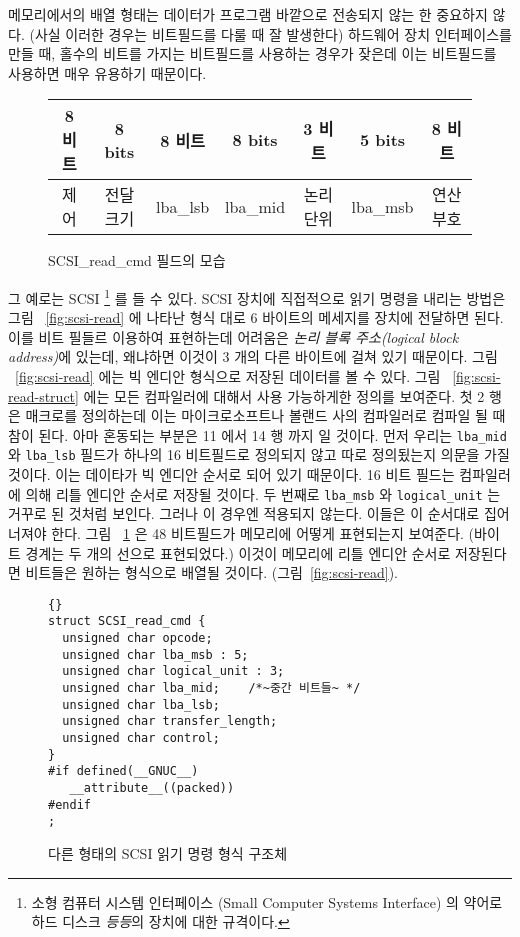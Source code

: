 메모리에서의 배열 형태는 데이터가 프로그램 바깥으로 전송되지 않는 한 중요하지 않다.
(사실 이러한 경우는 비트필드를 다룰 때 잘 발생한다) 하드웨어 장치 인터페이스를 만들 때,
홀수의 비트를 가지는 비트필드를 사용하는 경우가 잦은데 이는 비트필드를 사용하면 매우 유용하기 때문이다.

\begin{figure}[t]
\centering
\begin{tabular}{|c||c||c||c||c|c||c|}
\multicolumn{1}{c}{8 비트} & \multicolumn{1}{c}{8 bits} 
& \multicolumn{1}{c}{8 비트} & \multicolumn{1}{c}{8 bits} 
& \multicolumn{1}{c}{3 비트} & \multicolumn{1}{c}{5 bits} 
& \multicolumn{1}{c}{8 비트} \\ \hline
제어 & 전달크기 & lba\_lsb  & lba\_mid &  
논리 단위  & lba\_msb & 연산 부호 \\
\hline
\end{tabular}
\caption{{\code SCSI\_read\_cmd} 필드의 모습\label{fig:scsi-read-map}}
\end{figure}
그 예로는 SCSI \footnote{소형 컴퓨터 시스템 인터페이스 (Small Computer Systems Interface) 의 약어로
하드 디스크 \emph{등등}의 장치에 대한 규격이다.} 를 들 수 있다. SCSI 장치에 직접적으로 읽기 명령을 내리는
방법은 그림 ~\ref{fig:scsi-read} 에 나타난 형식 대로 6 바이트의 메세지를 장치에 전달하면 된다. 
이를 비트 필들르 이용하여 표현하는데 어려움은 \emph{논리 블록 주소(logical block address)}에 있는데, 왜냐하면
이것이 3 개의 다른 바이트에 걸쳐 있기 때문이다. 그림 ~\ref{fig:scsi-read} 에는 빅 엔디안 형식으로 저장된 데이터를
볼 수 있다. 그림 ~\ref{fig:scsi-read-struct} 에는 모든 컴파일러에 대해서 사용 가능하게한 정의를 보여준다. 첫 2 행은 매크로를
정의하는데 이는 마이크로소프트나 볼랜드 사의 컴파일러로 컴파일 될 때 참이 된다. 아마 혼동되는 부분은
11 에서 14 행 까지 일 것이다. 먼저 우리는 \lstinline|lba_mid| 와 \lstinline|lba_lsb| 필드가 하나의 16 비트필드로
정의되지 않고 따로 정의됬는지 의문을 가질 것이다. 이는 데이타가 빅 엔디안 순서로 되어 있기 때문이다. 16 비트 
필드는 컴파일러에 의해 리틀 엔디안 순서로 저장될 것이다. 두 번째로 \lstinline|lba_msb| 와 \lstinline|logical_unit| 는 거꾸로
된 것처럼 보인다. 그러나 이 경우엔 적용되지 않는다. 이들은 이 순서대로 집어너져야 한다. 그림 ~\ref{fig:scsi-read-map} 은
48 비트필드가 메모리에 어떻게 표현되는지 보여준다. (바이트 경계는 두 개의 선으로 표현되었다.) 이것이 메모리에 리틀 엔디안 순서로 저장된다면
비트들은 원하는 형식으로 배열될 것이다. (그림~\ref{fig:scsi-read}).

\begin{figure}[t]
\begin{lstlisting}[frame=lrtb,escapeinside=~~]{}
struct SCSI_read_cmd {
  unsigned char opcode;
  unsigned char lba_msb : 5;  
  unsigned char logical_unit : 3;
  unsigned char lba_mid;    /*~중간 비트들~ */
  unsigned char lba_lsb;
  unsigned char transfer_length;
  unsigned char control;
}
#if defined(__GNUC__)
   __attribute__((packed))
#endif
;
\end{lstlisting}
\caption{다른 형태의 SCSI 읽기 명령 형식 구조체 \label{fig:scsi-read-struct2}
         }
\end{figure}

